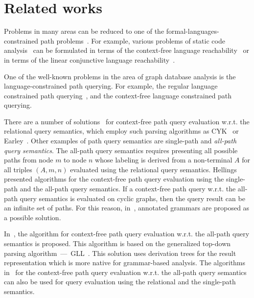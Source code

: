 \section{Related works} \label{section_related}
Problems in many areas can be reduced to one of the formal-languages-constrained path problems~\cite{barrett2000formal}. For example, various problems of static code analysis~\cite{bastani2015specification,xu2009scaling} can be formulated in terms of the context-free language reachability~\cite{reps1998program} or in terms of the linear conjunctive language reachability~\cite{zhang2017context}. 

One of the well-known problems in the area of graph database analysis is the language-constrained path querying. For example, the regular language constrained path querying~\cite{reutter2017regular, fan2011adding, abiteboul1997regular, nole2016regular}, and the context-free language constrained path querying.

There are a number of solutions~\cite{hellingsRelational, GraphQueryWithEarley, RDF} for context-free path query evaluation w.r.t. the relational query semantics, which employ such parsing algorithms as CYK~\cite{kasami, younger} or Earley~\cite{Grune}. Other examples of path query semantics are single-path and \textit{all-path query semantics}. The all-path query semantics requires presenting all possible paths from node $m$ to node $n$ whose labeling is derived from a non-terminal $A$ for all triples $(A, m, n)$ evaluated using the relational query semantics. Hellings~\cite{hellingsPathQuerying} presented algorithms for the context-free path query evaluation using the single-path and the all-path query semantics. If a context-free path query w.r.t. the all-path query semantics is evaluated on cyclic graphs, then the query result can be an infinite set of paths. For this reason, in~\cite{hellingsPathQuerying}, annotated grammars are proposed as a possible solution.

In~\cite{GLL}, the algorithm for context-free path query evaluation w.r.t. the all-path query semantics is proposed. This algorithm is based on the generalized top-down parsing algorithm~---~GLL~\cite{scott2010gll}. This solution uses derivation trees for the result representation which is more native for grammar-based analysis. The algorithms in~\cite{GLL, hellingsPathQuerying} for the context-free path query evaluation w.r.t. the all-path query semantics can also be used for query evaluation using the relational and the single-path semantics.

